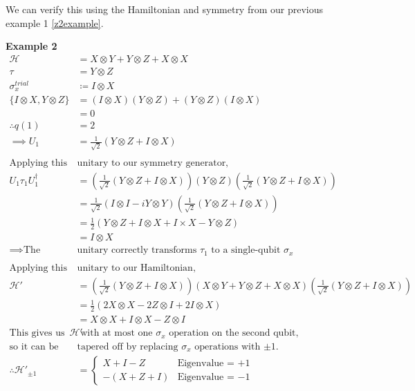 \documentclass{article}
\newcommand{\ham}{\mathcal{H}}
\begin{document}
We can verify this using the Hamiltonian and symmetry from our previous example 1 \ref{z2example}.
\begin{framed}\label{taperexample}
\textbf{Example 2}
\begin{align*}
    \ham &= X\otimes Y + Y \otimes Z + X \otimes X\\
    \tau &=Y \otimes Z\\
    \sigma_x^{trial} &\coloneq I \otimes X\\
    \{I \otimes X, Y \otimes Z\} &= (I \otimes X)(Y \otimes Z) + (Y \otimes Z)(I \otimes X)\\
    &=0\\
    \therefore q(1) &= 2\\
    \implies U_1 &= \frac{1}{\sqrt2} \left(Y\otimes Z + I \otimes X\right)\\\\
    \text{Applying this } & \text{unitary to our symmetry generator,}\\
    U_1 \tau_1 U_1^{\dagger} &= \left(\frac{1}{\sqrt2} \left(Y\otimes Z + I \otimes X\right)\right)(Y\otimes Z) \left(\frac{1}{\sqrt2} \left(Y\otimes Z + I \otimes X\right)\right)\\
    &= \frac{1}{\sqrt2}\left(I \otimes I - i Y \otimes Y\right)\left(\frac{1}{\sqrt2} \left(Y\otimes Z + I \otimes X\right)\right)\\
    &= \frac{1}{2}\left(Y \otimes Z + I \otimes X + I \times X - Y\otimes Z\right)\\
    &= I \otimes X\\
    \implies \text{The } &\text{unitary correctly transforms $\tau_1$ to a single-qubit $\sigma_x$}\\\\
    \text{Applying this } & \text{unitary to our Hamiltonian,}\\
    \ham' &= \left(\frac{1}{\sqrt2} \left(Y\otimes Z + I \otimes X\right)\right)(X\otimes Y + Y \otimes Z + X \otimes X)\left(\frac{1}{\sqrt2} \left(Y\otimes Z + I \otimes X\right)\right)\\
    &= \frac{1}{2}\left(2 X\otimes X - 2 Z \otimes I + 2 I \otimes X\right)\\
    &= X \otimes X + I \otimes X - Z\otimes I\\
    \text{This gives us a $\ham'$}&\text{ with at most one $\sigma_x$ operation on the second qubit,}\\
    \text{so it can be } & \text{tapered off by replacing $\sigma_x$ operations with $\pm1$.}\\
    \therefore \ham'_{\pm 1}&=\begin{cases}X+I-Z & \text{Eigenvalue = $+1$}\\-(X+Z+I)&\text{Eigenvalue = $-1$}\end{cases}
\end{align*}
\end{framed}
\end{document}
